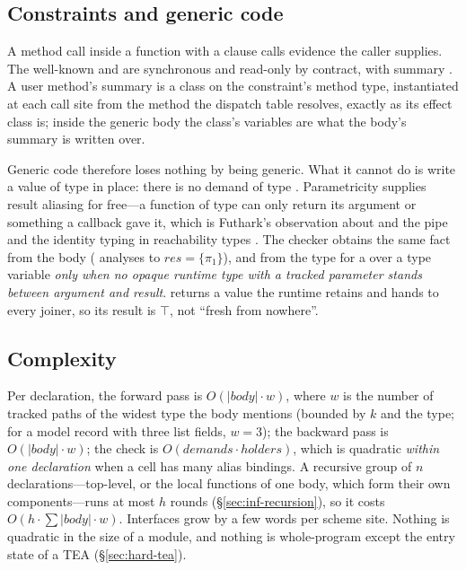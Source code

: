 \subsection{Constraints and generic code}
\label{sec:inf-generic}

A method call  inside a function with a  clause calls evidence the caller
supplies. The well-known  and  are synchronous and read-only by contract, with
summary . A user method's summary is a class on the constraint's
method type, instantiated at each call site from the method the dispatch table resolves, exactly as
its effect class is; inside the generic body the class's variables are what the body's summary is
written over.

Generic code therefore loses nothing by being generic. What it cannot do is write a value of type
 in place: there is no demand of type . Parametricity supplies result aliasing
for free---a function of type  can only return its argument or something a callback gave
it, which is Futhark's observation about  and the pipe \citep{henriksen2026aliasing} and the
identity typing in reachability types \citep{wei2024polymorphic}. The checker obtains the same fact
from the body ( analyses to $\mathit{res} = \{\pi_1\}$), and from the type for a
 over a type variable \emph{only when no opaque runtime type with a tracked parameter
stands between argument and result}.  returns a value the runtime
retains and hands to every joiner, so its result is $\top$, not ``fresh from nowhere''.

\subsection{Complexity}
\label{sec:inf-complexity}

Per declaration, the forward pass is $O(|\mathit{body}| \cdot w)$, where $w$ is the number of tracked
paths of the widest type the body mentions (bounded by $k$ and the type; for a model record with
three list fields, $w = 3$); the backward pass is $O(|\mathit{body}| \cdot w)$; the check is
$O(\mathit{demands} \cdot \mathit{holders})$, which is quadratic \emph{within one declaration} when a
cell has many alias bindings. A recursive group of $n$ declarations---top-level, or the local
functions of one body, which form their own components---runs at most $h$ rounds (\S\ref{sec:inf-recursion}),
so it costs $O(h \cdot \sum|\mathit{body}| \cdot w)$. Interfaces grow by a few words per scheme site.
Nothing is quadratic in the size of a module, and nothing is whole-program except the entry state of
a TEA  (\S\ref{sec:hard-tea}).

